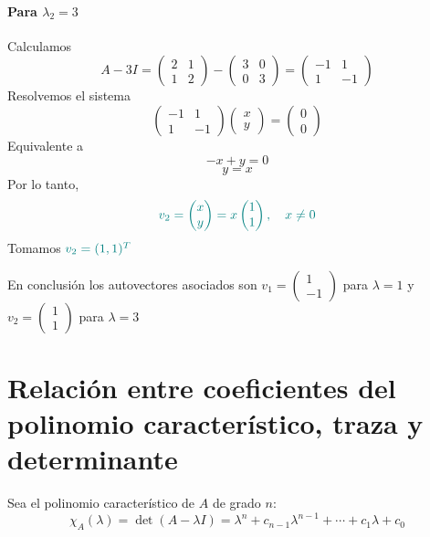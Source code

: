 \documentclass{article}
\begin{document}
\paragraph*{Para \(\lambda_2 = 3\)}
Calculamos
\[
A - 3I = \begin{pmatrix}
 2 & 1\\
 1 & 2
\end{pmatrix}
- \begin{pmatrix}
 3 & 0\\
 0 & 3
\end{pmatrix}
= \begin{pmatrix}
 -1 & 1\\
 1 & -1
\end{pmatrix}
\]
Resolvemos el sistema
\[
\begin{pmatrix}
 -1 & 1\\
 1 & -1
\end{pmatrix}
\begin{pmatrix}x\\y\end{pmatrix}
= \begin{pmatrix}0\\0\end{pmatrix}
\]
Equivalente a
\[
-x + y = 0
\]\[
y = x\]
Por lo tanto,
\[\color{teal}
v_2 = \begin{pmatrix}x\\y\end{pmatrix}
= x\begin{pmatrix}1\\1\end{pmatrix},
\quad x\neq 0
\]
Tomamos \(\color{teal}v_2 = (1,1)^T\)

En conclusión los autovectores asociados son
\(
v_1 = \begin{pmatrix}1\\-1\end{pmatrix}
\) para \(\lambda=1\)
 y 
\(
v_2 = \begin{pmatrix}1\\1\end{pmatrix}
\) para \(\lambda=3\)


\section*{Relación entre coeficientes del polinomio característico, traza y determinante}

Sea el polinomio característico de \(A\) de grado \(n\):
\[
\chi_A(\lambda)=\det(A-\lambda I)=\lambda^n + c_{n-1}\lambda^{n-1}+\cdots + c_1\lambda + c_0
\]
\end{document}
